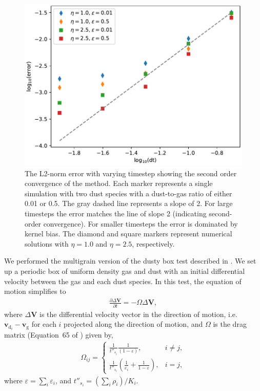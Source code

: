 \documentclass[fleqn,usenatbib]{mnras}
\newcommand{\g}{\mathrm{g}}
\newcommand{\dd}{\mathrm{d}}
\let\vec\bm
\begin{document}
\begin{figure}
   \begin{center}
      \includegraphics[width=\columnwidth]{figs/dustybox_accuracy.pdf}
      \caption{The L2-norm error with varying timestep showing the second order
         convergence of the method. Each marker represents a single simulation
         with two dust species with a dust-to-gas ratio of either 0.01 or 0.5.
         The gray dashed line represents a slope of 2. For large timesteps the
         error matches the line of slope 2 (indicating second-order
         convergence). For smaller timesteps the error is dominated by kernel
         bias. The diamond and square markers represent numerical solutions with
         $\eta=1.0$ and $\eta=2.5$, respectively.%
         \label{fig:dustybox-accuracy}}
   \end{center}
\end{figure}

We performed the multigrain version of the dusty box test described in
\citet{Laibe2011MNRAS.418.1491L}. We set up a periodic box of uniform density
gas and dust with an initial differential velocity between the gas and each dust
species. In this test, the equation of motion simplifies to
%
\begin{align}
   \frac{\partial \Delta \vec{V}}{\partial t} = - \Omega \Delta \vec{V},
\end{align}
%
where \(\Delta \vec{V}\) is the differential velocity vector in the direction of
motion, i.e. \(\vec{v}_{\dd_i} - \vec{v}_{\g}\) for each \(i\) projected along
the direction of motion, and \(\Omega\) is the drag matrix (Equation~65 of
\citealt{Laibe2014MNRAS.444.1940L}) given by,
%
\begin{align}
   \Omega_{ij} =
   \begin{cases}
      \frac{1}{t''_{s_i}} \frac{1}{(1 - \varepsilon)}, &i \neq j,\\
      \frac{1}{t''_{s_i}} \left( \frac{1}{\varepsilon_i} +
         \frac{1}{1 - \varepsilon} \right), &i = j,
   \end{cases}
\end{align}
%
where \( \varepsilon = \sum_i \varepsilon_i \), and \( t''_{s_i} = \left( \sum_i
\rho_i \right) / K_i \).
\end{document}
